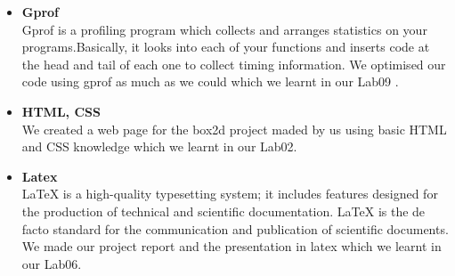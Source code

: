 \documentclass{article}
\begin{document}
\begin{itemize}
\begin{itemize}[label=$\blacksquare$]
            \item \textbf{\Large Gprof }\\
            \large Gprof is a profiling program which collects and arranges statistics on your programs.Basically, it looks into each of your functions and inserts code at the head and tail of each one to collect timing information. We optimised our code using gprof as much as we could which we learnt in our Lab09 . \vspace{0.60 cm}

            \item \textbf{\Large HTML, CSS }\\
            \large We created a web page for the box2d project maded by us using basic HTML and CSS knowledge which we learnt in our Lab02.\vspace{0.60 cm}

            \item \textbf{\Large Latex }\\ 
            \large LaTeX is a high-quality typesetting system; it includes features designed for the production of technical and scientific documentation. LaTeX is the de facto standard for the communication and publication of scientific documents. We made our project report and the presentation in latex which we learnt in our Lab06. \vspace{0.60 cm}
 \end{itemize}
        \end{itemize}
    \clearpage
\end{document}

